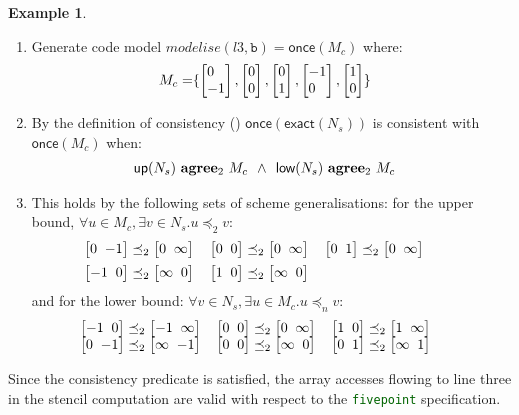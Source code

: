 \documentclass[10pt,preprint,numbers]{sigplanconf}
\newcounter{block}
\theoremstyle{definition}
\newtheorem{example}[block]{Example}
\newcommand{\vtwoh}[2]{\setlength{\arraycolsep}{0em}
\left[\begin{array}{cc}#1 \; & \; #2\end{array}\right]}
\newcommand{\vtwo}[2]{\setlength{\arraycolsep}{0em}
\left[\begin{array}{l}#1\\#2\end{array}\right]}
\newcommand{\consAName}{\textbf{agree}}
\newcommand{\consSub}[3]{#2 \,\, \consAName{}_{#1} \,\,#3}
\begin{document}
\begin{example}
\begin{enumerate}
\item Generate code model $\textit{modelise}(l3, \texttt{b}) =
  \textsf{once} (M_c)$ where:
%
\vspace{-0.7em}
\begin{align*}
M_c = & \{
    \vtwo{0}{-1},
    \vtwo{0}{0},
    \vtwo{0}{1},
    \vtwo{-1}{0},
    \vtwo{1}{0}
  \}
\end{align*}
\vspace{-1em}
%
\item By the definition of consistency ()
 $\textsf{once}(\textsf{exact}(N_s))$ is consistent with
  $\textsf{once}(M_c)$ when:
  \begin{align*}
\vspace{-0.3em}
    & \consSub{2}{\textsf{up}(N_s)}{M_c} \;\,
    \wedge \;\, \consSub{2}{\textsf{low}(N_s)}{M_c}
\vspace{-0.3em}
  \end{align*}
%
\item This holds by the following sets of scheme
  generalisations: for the upper bound, $\forall u \in M_c,
  \exists v \in N_s . u \preceq_2 v$:
  \begin{align}
    \hspace{-1em}
    \begin{array}{l}
   \hspace{-1.5em}
     \vtwoh{0}{-1} \preceq_2 \vtwoh{0}{\infty} \quad
     \vtwoh{0}{0} \preceq_2 \vtwoh{0}{\infty} \quad
     \vtwoh{0}{1} \preceq_2 \vtwoh{0}{\infty} \\[0.5em]
        \hspace{-1.5em}\vtwoh{-1}{0} \preceq_2 \vtwoh{\infty}{0} \quad
     \vtwoh{1}{0} \preceq_2 \vtwoh{\infty}{0}
     \end{array}
  \label{eq:check-example-upper}
  \end{align}
  and for the lower bound: $\forall v \in N_s, \exists u \in M_c . u
  \preceq_n v$:
  \begin{align}
    \hspace{-1em}
    \begin{array}{l}
     \hspace{-1.3em}\vtwoh{-1}{0} \preceq_2 \vtwoh{-1}{\infty} \quad
     \vtwoh{0}{0} \preceq_2 \vtwoh{0}{\infty} \quad
     \vtwoh{1}{0} \preceq_2 \vtwoh{1}{\infty}  \\
     \hspace{-1.3em}\vtwoh{0}{-1}  \preceq_2 \vtwoh{\infty}{-1} \quad
     \vtwoh{0}{0}  \preceq_2 \vtwoh{\infty}{0} \quad
     \vtwoh{0}{1}  \preceq_2 \vtwoh{\infty}{1}
     \end{array}
    \label{eq:check-example-lower}
  \end{align}
\end{enumerate}
Since the consistency predicate is satisfied, the array
  accesses flowing to line three in the stencil computation are valid
  with respect to the {\textcolor{darkgreen}{\texttt{fivepoint}}} specification.
\end{example}
\end{document}
